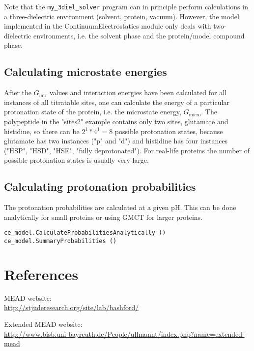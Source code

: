 \documentclass[a4paper,11pt]{article}
\newcommand{\modulename}{ContinuumElectrostatics\xspace}
\begin{document}
Note that the \texttt{my\_3diel\_solver} program can in principle perform calculations
in a three-dielectric environment (solvent, protein, vacuum).
%
However, the model implemented in the \modulename module only deals with two-dielectric environments, 
i.e. the solvent phase and the protein/model compound phase.


\subsection{Calculating microstate energies}

After the $G_{\mathrm{intr}}$ values and interaction energies have been calculated 
for all instances of all titratable sites, 
one can calculate the energy of a particular protonation state of the protein, i.e. 
the microstate energy, $G_{\mathrm{micro}}$.
%
The polypeptide in the "sites2" example contains only two sites, 
glutamate and histidine,
so there can be $2^1 * 4^1 = 8$ possible protonation states, because glutamate has two
instances ("p" and "d") and histidine has four instances ("HSP", "HSD", "HSE", "fully deprotonated").
%
For real-life proteins the number of possible protonation states is usually very large.



\subsection{Calculating protonation probabilities}

The protonation probabilities are calculated at a given pH.
%
This can be done analytically for small proteins or using GMCT for larger proteins.

{\footnotesize \begin{lstlisting}
ce_model.CalculateProbabilitiesAnalytically ()
ce_model.SummaryProbabilities ()
\end{lstlisting} }


\section{References}
MEAD website: \\
\url{http://stjuderesearch.org/site/lab/bashford/}

Extended MEAD website:\\
\url{http://www.bisb.uni-bayreuth.de/People/ullmannt/index.php?name=extended-mead}
\end{document}
